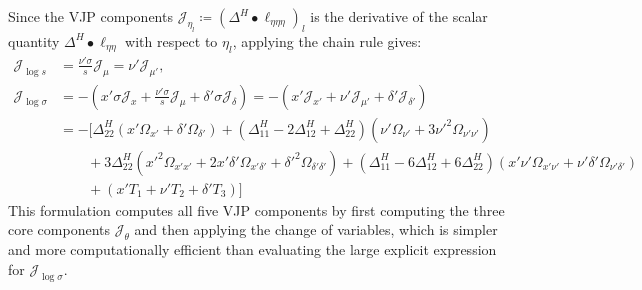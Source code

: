 \documentclass{article}
\begin{document}
%
Since the VJP components $\mathcal{J}_{\eta_l} \coloneqq (\Delta^H \bullet \ell_{\eta\eta\eta})_l$ is the derivative of the scalar quantity $\Delta^H \bullet \ell_{\eta\eta}$ with respect to $\eta_l$, applying the chain rule gives:
%
\begin{align}
  \mathcal{J}_{\log s}      & = \frac{\nu' \sigma}{s} \mathcal{J}_{\mu} = \nu' \mathcal{J}_{\mu'},                                                                                                                                                                           \\
  \mathcal{J}_{\log \sigma} & = - \left( x' \sigma \mathcal{J}_x + \frac{\nu' \sigma}{s} \mathcal{J}_\mu + \delta' \sigma \mathcal{J}_\delta \right) = - (x' \mathcal{J}_{x'} + \nu' \mathcal{J}_{\mu'} + \delta' \mathcal{J}_{\delta'}) \nonumber                           \\
                            & = - \Big[ \Delta^H_{22} (x' \Omega_{x'} + \delta' \Omega_{\delta'}) + (\Delta^H_{11} - 2\Delta^H_{12} + \Delta^H_{22}) (\nu' \Omega_{\nu'} + 3 \nu'^2 \Omega_{\nu'\nu'}) \nonumber                                                             \\
                            & \qquad + 3 \Delta^H_{22} (x'^2 \Omega_{x'x'} + 2 x'\delta' \Omega_{x'\delta'} + \delta'^2 \Omega_{\delta'\delta'}) + (\Delta^H_{11} - 6\Delta^H_{12} + 6\Delta^H_{22}) (x' \nu' \Omega_{x'\nu'} + \nu' \delta' \Omega_{\nu'\delta'}) \nonumber \\
                            & \qquad + (x' T_1 + \nu' T_2 + \delta' T_3) \Big]
\end{align}
%
This formulation computes all five VJP components by first computing the three core components $\mathcal{J}_{\theta}$ and then applying the change of variables, which is simpler and more computationally efficient than evaluating the large explicit expression for $\mathcal{J}_{\log \sigma}$.
\end{document}
